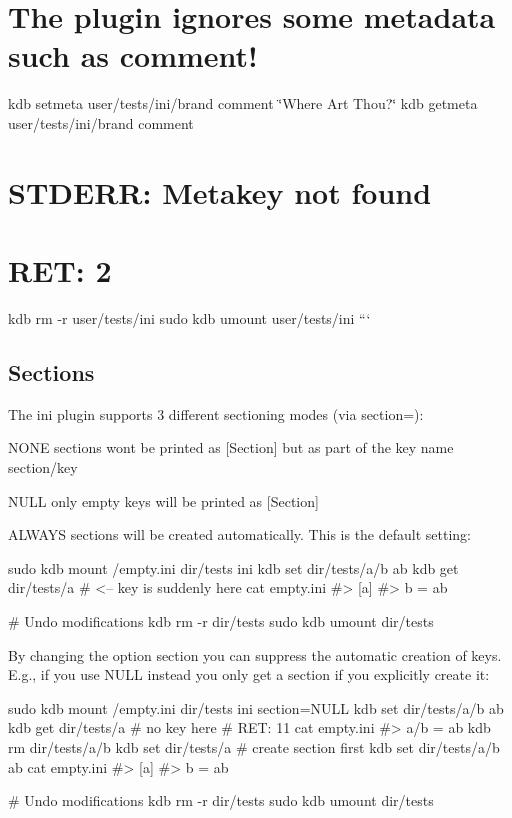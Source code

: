 \section*{The plugin ignores some metadata such as {\ttfamily comment}!}

kdb setmeta user/tests/ini/brand comment \char`\"{}\+Where Art Thou?\char`\"{} kdb getmeta user/tests/ini/brand comment \section*{S\+T\+D\+E\+RR\+: Metakey not found}

\section*{R\+ET\+: 2}

kdb rm -\/r user/tests/ini sudo kdb umount user/tests/ini ```

\subsection*{Sections}

The ini plugin supports 3 different sectioning modes (via {\ttfamily section=})\+:


\begin{DoxyItemize}
\item {\ttfamily N\+O\+NE} sections wont be printed as {\ttfamily \mbox{[}Section\mbox{]}} but as part of the key name {\ttfamily section/key}
\item {\ttfamily N\+U\+LL} only empty keys will be printed as {\ttfamily \mbox{[}Section\mbox{]}}
\item {\ttfamily A\+L\+W\+A\+YS} sections will be created automatically. This is the default setting\+:
\end{DoxyItemize}


\begin{DoxyCode}
sudo kdb mount /empty.ini dir/tests ini
kdb set dir/tests/a/b ab
kdb get dir/tests/a       # <-- key is suddenly here
cat empty.ini
#> [a]
#> b = ab

# Undo modifications
kdb rm -r dir/tests
sudo kdb umount dir/tests
\end{DoxyCode}


By changing the option {\ttfamily section} you can suppress the automatic creation of keys. E.\+g., if you use {\ttfamily N\+U\+LL} instead you only get a section if you explicitly create it\+:


\begin{DoxyCode}
sudo kdb mount /empty.ini dir/tests ini section=NULL
kdb set dir/tests/a/b ab
kdb get dir/tests/a       # no key here
# RET: 11
cat empty.ini
#> a/b = ab
kdb rm dir/tests/a/b
kdb set dir/tests/a    # create section first
kdb set dir/tests/a/b ab
cat empty.ini
#> [a]
#> b = ab

# Undo modifications
kdb rm -r dir/tests
sudo kdb umount dir/tests
\end{DoxyCode}


